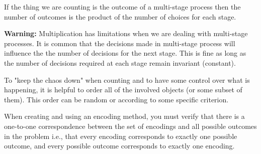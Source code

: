 \begin{tcolorbox}[title={PST: Menus Make You Multiply}, colback={white},colframe={black},sharp corners,colbacktitle={white},coltitle={black},fonttitle=\bfseries,subtitle style={boxrule=0.4pt,colback=white}]
		
If the thing we are counting is the outcome of a multi-stage process then the number of outcomes is the product of the number of choices for each stage.
		
\tcblower
		
\textbf{Warning:} Multiplication has limitations when we are dealing with multi-stage processes. It is common that the decisions made in multi-stage process will influence the the number of decisions for the next stage. This is fine as long as the number of decisions required at each stage remain invariant (constant).
\end{tcolorbox}

\begin{tcolorbox}[title={PPST: Keep the Chaos Down}, colback={white},colframe={black},sharp corners,colbacktitle={white},coltitle={black},fonttitle=\bfseries,subtitle style={boxrule=0.4pt,colback=white}]
To "keep the chaos down" when counting and to have some control over what is happening, it is helpful to order all of the involved objects (or some subset of them). This order can be random or according to some specific criterion.
\end{tcolorbox}


\begin{tcolorbox}[title={PST: Encoding}, colback={white},colframe={black},sharp corners,colbacktitle={white},coltitle={black},fonttitle=\bfseries,subtitle style={boxrule=0.4pt,colback=white}]

When creating and using an encoding method, you must verify that there is a one-to-one correspondence between the set of encodings and all possible outcomes in the problem i.e., that every encoding corresponds to exactly one possible outcome, and every possible outcome corresponds to exactly one encoding.
\end{tcolorbox}
	
